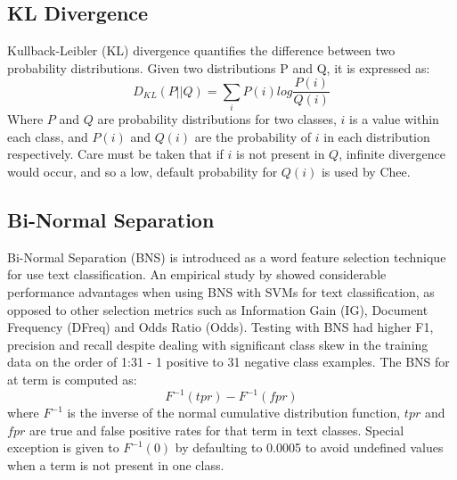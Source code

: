\documentclass[twoside,11pt]{article}
\begin{document}
\subsection{KL Divergence}
Kullback-Leibler (KL) divergence quantifies the difference between two probability distributions. Given two distributions P and Q, it is expressed as:
\[
  D_{KL}(P||Q) = \sum_{i}P(i)log\frac{P(i)}{Q(i)}
\]
Where $P$ and $Q$ are probability distributions for two classes, $i$ is a value within each class, and $P(i)$ and $Q(i)$ are the probability of $i$ in each distribution respectively. Care must be taken that if $i$ is not present in $Q$, infinite divergence would occur, and so a low, default probability for $Q(i)$ is used by Chee.

\subsection{Bi-Normal Separation}
Bi-Normal Separation (BNS) is introduced as a word feature selection technique for use text classification. An empirical study by \citet{Forman} showed considerable performance advantages when using BNS with SVMs for text classification, as opposed to other selection metrics such as Information Gain (IG), Document Frequency (DFreq) and Odds Ratio (Odds). Testing with BNS had higher F1, precision and recall despite dealing with significant class skew in the training data on the order of 1:31 - 1 positive to 31 negative class examples. The BNS for at term is computed as:
\[
  F^{-1}(tpr) - F^{-1}(fpr)
\]
where $F^{-1}$ is the inverse of the normal cumulative distribution function, $tpr$ and $fpr$ are true and false positive rates for that term in text classes. Special exception is given to $F^{-1}(0)$ by defaulting to 0.0005 to avoid undefined values when a term is not present in one class.
\end{document}
